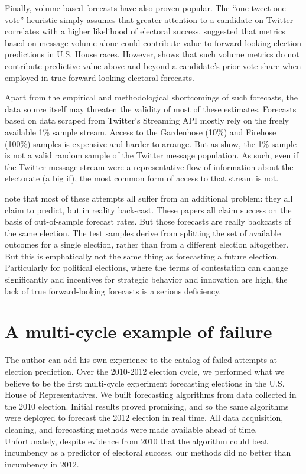 \documentclass{article}
\begin{document}
Finally, volume-based forecasts have also proven popular. The ``one
tweet one vote'' heuristic simply assumes that greater attention to a
candidate on Twitter correlates with a higher likelihood of electoral
success. \cite{digrazia2013} suggested that metrics based on message
volume alone could contribute value to forward-looking election
predictions in U.S. House races. However, \cite{huberty2013twitter}
shows that such volume metrics do not contribute predictive value above
and beyond a candidate's prior vote share when employed in true
forward-looking electoral forecasts.

Apart from the empirical and methodological shortcomings of such
forecasts, the data source itself may threaten the validity of most of
these estimates. Forecasts based on data scraped from Twitter's
Streaming API mostly rely on the freely available 1\% sample
stream. Access to the Gardenhose (10\%) and Firehose (100\%)
samples is expensive and harder to arrange. But as
\cite{morstatter2013sample} show, the 1\% sample is not a valid random
sample of the Twitter message population. As such, even if the Twitter
message stream were a representative flow of information about the
electorate (a big if), the most common form of access to that stream
is not. 

\cite{metaxas2011not} note that most of these attempts all suffer from
an additional problem: they all claim to predict, but in reality
back-cast. These papers all claim success on the basis of
out-of-sample forecast rates. But those forecasts are really backcasts
of the same election. The test samples derive from splitting the set
of available outcomes for a single election, rather than from a
different election altogether. But this is emphatically not the same
thing as forecasting a future election. Particularly for political
elections, where the terms of contestation can change significantly
and incentives for strategic behavior and innovation are high, the
lack of true forward-looking forecasts is a serious deficiency.


\section{A multi-cycle example of failure}
\label{sec:multi-cycle-example}


The author can add his own experience to the catalog of failed attempts at
election prediction. Over the 2010-2012 election cycle, we performed
what we believe to be the first multi-cycle experiment forecasting
elections in the U.S. House of Representatives. We built forecasting
algorithms from data collected in the 2010 election. Initial results
proved promising, and so the same algorithms were deployed to forecast
the 2012 election in real time. All data acquisition, cleaning, and
forecasting methods were made available ahead of time. Unfortunately,
despite evidence from 2010 that the algorithm could beat incumbency as a
predictor of electoral success, our methods did no better than
incumbency in 2012.
\end{document}
